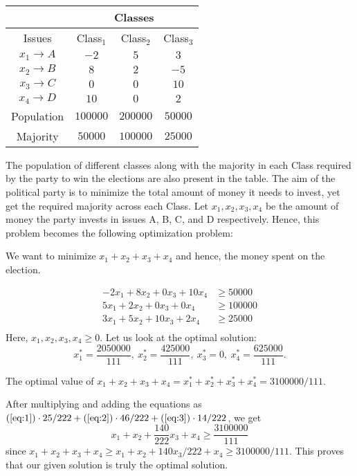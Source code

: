\documentclass[twoside]{article}
\begin{document}
\begin{table}[htbp]
  \centering
  \begin{tabular}{|c|c|c|c|}
    \hline
    \multicolumn{1}{|c|}{} & \multicolumn{3}{c|}{Classes} \\
    \hline
    Issues & Class$_1$ & Class$_2$ & Class$_3$  \\
    \hline
    $x_1 \rightarrow A $ & $-2$ & $5$ & $3$  \\
    \hline
    $x_2 \rightarrow B $ & $8$ & $2$ & $-5$  \\
    \hline
    $x_3 \rightarrow C $ & $0$ & $0$ & $10$  \\
    \hline
    $x_4 \rightarrow D $ & $10$ & $0$ & $2$ \\
    \hline
    Population & $100000$ & $200000$ & $50000$\\
    \hline
    Majority & $50000$ & $100000$ & $25000$\\
    \hline
  \end{tabular}
  \label{tab:election_grid}
\end{table}

The population of different classes along with the majority in each Class
required by the party to win the elections are also present in the table. The
aim of the political party is to minimize the total amount of money it needs to
invest, yet get the required majority across each Class. Let $x_1, x_2,x_3,x_4$
be the amount of money the party invests in issues A, B, C, and D respectively.
Hence, this problem becomes the following optimization problem:

We want to minimize $x_1+x_2+x_3+x_4$ and hence, the money spent on the election.

\begin{align}
    -2x_1 + 8x_2 +  0x_3 + 10x_4 &\geq 50000  \label{eq:1} \\
     5x_1 + 2x_2 +  0x_3 +  0x_4 &\geq 100000 \label{eq:2} \\
     3x_1 + 5x_2 + 10x_3 +  2x_4 &\geq 25000  \label{eq:3} \\
\end{align}
Here, $x_1,x_2,x_3,x_4 \geq 0.$ Let us look at the optimal solution: \[
    x_1^* = \frac{2050000}{111},\ x_2^* = \frac{425000}{111},\
    x_3^* = 0,\ x_4^* = \frac{625000}{111}.
\] 

The optimal value of
$x_1 + x_2 + x_3 + x_4 = x_1^* + x_2^* + x_3^* + x_4^* = 3100000/111.$

After multiplying and adding the equations as
$(\ref{eq:1}) \cdot 25/222 + (\ref{eq:2}) \cdot 46/222 + (\ref{eq:3}) \cdot 14/222$,
we get \[
        x_1 + x_2 + \frac{140}{222}x_3 + x_4 \geq \frac{3100000}{111}
\] since $x_1 + x_2 + x_3 + x_4 \geq x_1 + x_2 + 140 x_3/222 + x_4 \geq 3100000/111.$
This proves that our given solution is truly the optimal solution.
\end{document}
